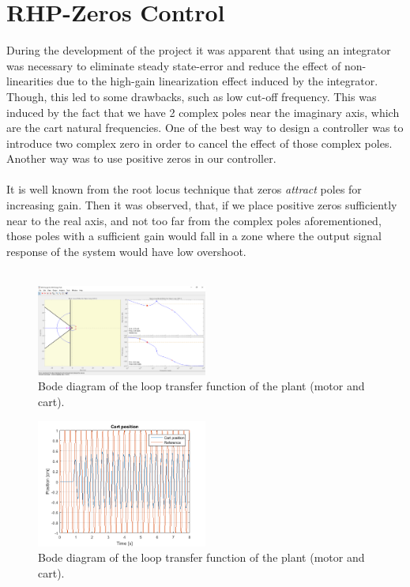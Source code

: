 \section{RHP-Zeros Control}
During the development of the project it was apparent that using an integrator was necessary to eliminate steady state-error and reduce the effect of non-linearities due to the high-gain linearization effect induced by the integrator. Though, this led to some drawbacks, such as low cut-off frequency. This was induced by the fact that we have 2 complex poles near the imaginary axis, which are the cart natural frequencies. One of the best way to design a controller was to introduce two complex zero in order to cancel the effect of those complex poles. Another way was to use positive zeros in our controller.\\ \\
It is well known from the root locus technique that zeros \emph{attract} poles for increasing gain. Then it was observed, that, if we place positive zeros sufficiently near to the real axis, and not too far from the complex poles  aforementioned, those poles with a sufficient gain would fall in a zone where the output signal response of the system would have low overshoot. \\ \\

\begin{figure}[h]
\centering
\includegraphics[width=0.5\textwidth]{img/pos_zeros_design.png}
\caption{Bode diagram of the loop transfer function of the plant (motor and cart).}
\end{figure}

\begin{figure}[h]
\centering
\includegraphics[width=0.5\textwidth]{img/pos_zeros_sin.png}
\caption{Bode diagram of the loop transfer function of the plant (motor and cart).}
\end{figure}


